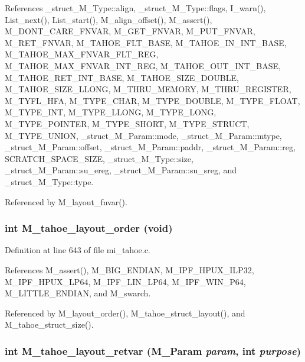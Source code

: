 References \_\-struct\_\-M\_\-Type::align, \_\-struct\_\-M\_\-Type::flags, I\_\-warn(), List\_\-next(), List\_\-start(), M\_\-align\_\-offset(), M\_\-assert(), M\_\-DONT\_\-CARE\_\-FNVAR, M\_\-GET\_\-FNVAR, M\_\-PUT\_\-FNVAR, M\_\-RET\_\-FNVAR, M\_\-TAHOE\_\-FLT\_\-BASE, M\_\-TAHOE\_\-IN\_\-INT\_\-BASE, M\_\-TAHOE\_\-MAX\_\-FNVAR\_\-FLT\_\-REG, M\_\-TAHOE\_\-MAX\_\-FNVAR\_\-INT\_\-REG, M\_\-TAHOE\_\-OUT\_\-INT\_\-BASE, M\_\-TAHOE\_\-RET\_\-INT\_\-BASE, M\_\-TAHOE\_\-SIZE\_\-DOUBLE, M\_\-TAHOE\_\-SIZE\_\-LLONG, M\_\-THRU\_\-MEMORY, M\_\-THRU\_\-REGISTER, M\_\-TYFL\_\-HFA, M\_\-TYPE\_\-CHAR, M\_\-TYPE\_\-DOUBLE, M\_\-TYPE\_\-FLOAT, M\_\-TYPE\_\-INT, M\_\-TYPE\_\-LLONG, M\_\-TYPE\_\-LONG, M\_\-TYPE\_\-POINTER, M\_\-TYPE\_\-SHORT, M\_\-TYPE\_\-STRUCT, M\_\-TYPE\_\-UNION, \_\-struct\_\-M\_\-Param::mode, \_\-struct\_\-M\_\-Param::mtype, \_\-struct\_\-M\_\-Param::offset, \_\-struct\_\-M\_\-Param::paddr, \_\-struct\_\-M\_\-Param::reg, SCRATCH\_\-SPACE\_\-SIZE, \_\-struct\_\-M\_\-Type::size, \_\-struct\_\-M\_\-Param::su\_\-ereg, \_\-struct\_\-M\_\-Param::su\_\-sreg, and \_\-struct\_\-M\_\-Type::type.

Referenced by M\_\-layout\_\-fnvar().
\subsubsection{\setlength{\rightskip}{0pt plus 5cm}int M\_\-tahoe\_\-layout\_\-order (void)}\label{m__tahoe_8h_0fd8e321e9349bd76e6174982b5a4817}




Definition at line 643 of file mi\_\-tahoe.c.

References M\_\-assert(), M\_\-BIG\_\-ENDIAN, M\_\-IPF\_\-HPUX\_\-ILP32, M\_\-IPF\_\-HPUX\_\-LP64, M\_\-IPF\_\-LIN\_\-LP64, M\_\-IPF\_\-WIN\_\-P64, M\_\-LITTLE\_\-ENDIAN, and M\_\-swarch.

Referenced by M\_\-layout\_\-order(), M\_\-tahoe\_\-struct\_\-layout(), and M\_\-tahoe\_\-struct\_\-size().
\subsubsection{\setlength{\rightskip}{0pt plus 5cm}int M\_\-tahoe\_\-layout\_\-retvar (\bf{M\_\-Param} {\em param}, int {\em purpose})}\label{m__tahoe_8h_966af636704e0a28c519bce1e12aaeae}




